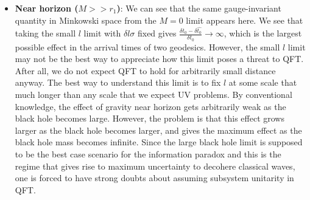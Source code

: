 \documentclass[aps,showpacs,onecolumn,floats,prd,superscriptaddress,nofootinbib]{revtex4-1}
\begin{document}
\begin{itemize}
\item \textbf{Near horizon ($M>>r_1$)}: We can see that the same gauge-invariant quantity in Minkowski space from the $M=0$ limit appears here. We see that taking the small $l$ limit with $\delta l \sigma$ fixed gives $\frac{\delta t_0 - \delta \hat{t_0}}{\delta t_0} \rightarrow \infty$, which is the largest possible effect in the arrival times of two geodesics. However, the small $l$ limit may not be the best way to appreciate how this limit poses a threat to QFT. 
After all, we do not expect QFT to hold for arbitrarily small distance anyway. 
The best way to understand this limit is to fix $l$ at some scale that much longer than any scale that we expect UV problems. 
By conventional knowledge, the effect of gravity near horizon gets arbitrarily weak as the black hole becomes large. 
However, the problem is that this effect grows larger as the black hole becomes larger, and gives the maximum effect as the black hole mass becomes infinite.
Since the large black hole limit is supposed to be the best case scenario for the information paradox and this is the regime that gives rise to maximum uncertainty to decohere classical waves, one is forced to have strong doubts about assuming subsystem unitarity in QFT.

\end{itemize}

\end{document}
